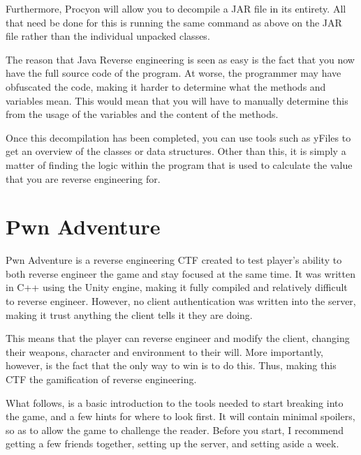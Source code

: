 		Furthermore, Procyon will allow you to decompile a JAR file in its entirety. 
		All that need be done for this is running the same command as above on the JAR file rather than the individual unpacked classes. 

		The reason that Java Reverse engineering is seen as easy is the fact that you now have the full source code of the program. 
		At worse, the programmer may have obfuscated the code, making it harder to determine what the methods and variables mean. 
		This would mean that you will have to manually determine this from the usage of the variables and the content of the methods.

		Once this decompilation has been completed, you can use tools such as yFiles to get an overview of the classes or data structures. 
		Other than this, it is simply a matter of finding the logic within the program that is used to calculate the value that you are reverse engineering for. 
	
	\section{Pwn Adventure}
		Pwn Adventure is a reverse engineering CTF created to test player's ability to both reverse engineer the game and stay focused at the same time.
		It was written in C++ using the Unity engine, making it fully compiled and relatively difficult to reverse engineer. 
		However, no client authentication was written into the server, making it trust anything the client tells it they are doing.

		This means that the player can reverse engineer and modify the client, changing their weapons, character and environment to their will. 
		More importantly, however, is the fact that the only way to win is to do this.
		Thus, making this CTF the gamification of reverse engineering. 

		What follows, is a basic introduction to the tools needed to start breaking into the game, and a few hints for where to look first. 
		It will contain minimal spoilers, so as to allow the game to challenge the reader. 
		Before you start, I recommend getting a few friends together, setting up the server, and setting aside a week. 
